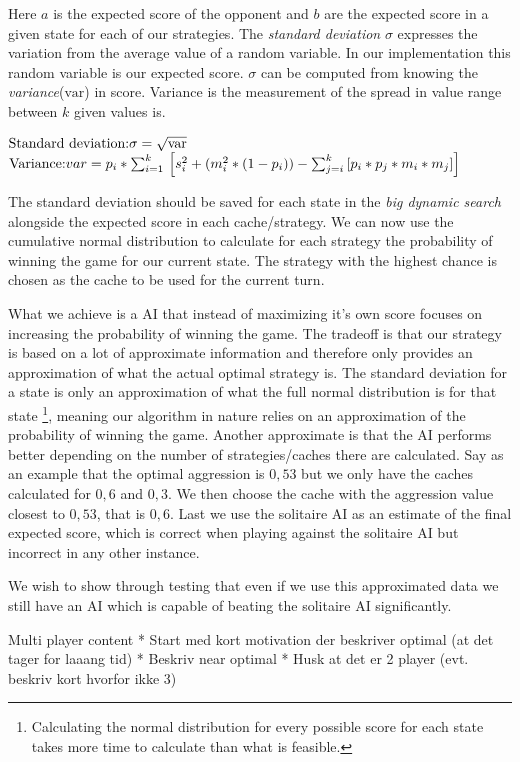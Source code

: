 Here $a$ is the expected score of the opponent and $b$ are the expected score in a given state for each of our strategies. The \emph{standard deviation} $\sigma$ expresses the variation from the average value of a random variable. In our implementation this random variable is our expected score. $\sigma$ can be computed from knowing the \emph{variance}($\mbox{var}$) in score. Variance is the measurement of the spread in value range between $k$ given values is.

$\newline\mbox{Standard deviation:} \newline \sigma = \sqrt{\mbox{var}} $
$\newline \mbox{Variance:} \newline var = p_i * \sum_{i=1}^{k} \newline\left[s_i^2 + (m_i^2 * (1 - p_i)) - \sum_{j=i}^{k} \left[p_i * p_j * m_i * m_j\right]\right]$\newline

The standard deviation should be saved for each state in the \emph{big dynamic search} alongside the expected score in each cache/strategy. We can now use the cumulative normal distribution to calculate for each strategy the probability of winning the game for our current state. The strategy with the highest chance is chosen as the cache to be used for the current turn.

What we achieve is a AI that instead of maximizing it's own score focuses on increasing the probability of winning the game. The tradeoff is that our strategy is based on a lot of approximate information and therefore only provides an approximation of what the actual optimal strategy is. The standard deviation for a state is only an approximation of what the full normal distribution is for that state \footnote{Calculating the normal distribution for every possible score for each state takes more time to calculate than what is feasible.}, meaning our algorithm in nature relies on an approximation of the probability of winning the game. Another approximate is that the AI performs better depending on the number of strategies/caches there are calculated. Say as an example that the optimal aggression is $0,53$ but we only have the caches calculated for $0,6$ and $0,3$. We then choose the cache with the aggression value closest to $0,53$, that is $0,6$. Last we use the solitaire AI as an estimate of the final expected score, which is correct when playing against the solitaire AI but incorrect in any other instance.

We wish to show through testing that even if we use this approximated data we still have an AI which is capable of beating the solitaire AI significantly.

Multi player content
* Start med kort motivation der beskriver optimal (at det tager for laaang tid)
* Beskriv near optimal
* Husk at det er 2 player (evt. beskriv kort hvorfor ikke 3)

